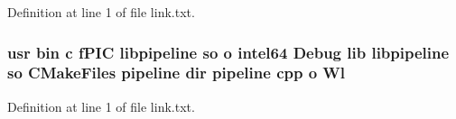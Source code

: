 Definition at line 1 of file link.\+txt.

\subsubsection[{\texorpdfstring{Wl}{Wl}}]{\setlength{\rightskip}{0pt plus 5cm}usr bin {\bf c} f\+P\+IC libpipeline {\bf so} o intel64 Debug lib libpipeline {\bf so} C\+Make\+Files pipeline dir pipeline cpp o Wl}\hypertarget{common_2pipeline_2CMakeFiles_2pipeline_8dir_2link_8txt_a8c57c9970d8ceee9abbea620f9401d1e}{}\label{common_2pipeline_2CMakeFiles_2pipeline_8dir_2link_8txt_a8c57c9970d8ceee9abbea620f9401d1e}


Definition at line 1 of file link.\+txt.

